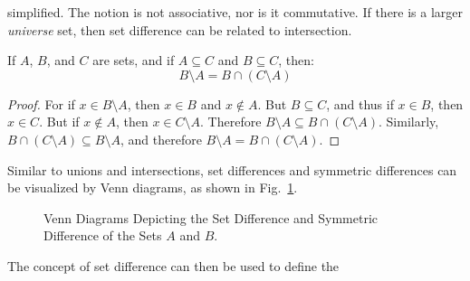         simplified. The notion is not associative, nor is it
        commutative. If there is a larger \textit{universe}
        set, then set difference can be related to
        intersection.
        \begin{theorem}
            \label{thm:Set_Difference_As_Intersection}%
            If $A$, $B$, and $C$ are sets, and if
            $A\subseteq{C}$ and $B\subseteq{C}$, then:
            \begin{equation}
                B\setminus{A}=B\cap(C\setminus{A})
            \end{equation}
        \end{theorem}
        \begin{proof}
            For if $x\in{B}\setminus{A}$, then
            $x\in{B}$ and $x\notin{A}$. But
            $B\subseteq{C}$, and thus if $x\in{B}$, then
            $x\in{C}$. But if $x\notin{A}$, then
            $x\in{C}\setminus{A}$. Therefore
            $B\setminus{A}\subseteq{B}\cap(C\setminus{A})$.
            Similarly,
            $B\cap(C\setminus{A})\subseteq{B}\setminus{A}$,
            and therefore
            $B\setminus{A}={B}\cap(C\setminus{A})$.
        \end{proof}
        Similar to unions and intersections,
        set differences and symmetric differences can be
        visualized by Venn diagrams, as shown in
        Fig.~\ref{fig:Difference_Sym_Venn_Diagram}.
        \begin{figure}[H]
            \centering
            \captionsetup{type=figure}
            \begin{subfigure}[b]{\textwidth}
                \centering
                
            \end{subfigure}
            \begin{subfigure}[b]{\textwidth}
                \centering
                
            \end{subfigure}
            \caption[Venn Diagrams for Set Difference
                    and Symmetric Difference]
                    {Venn Diagrams Depicting the Set
                    Difference and Symmetric Difference
                    of the Sets $A$ and $B$.}
            \label{fig:Difference_Sym_Venn_Diagram}
        \end{figure}
        The concept of set difference can then be used to define the
